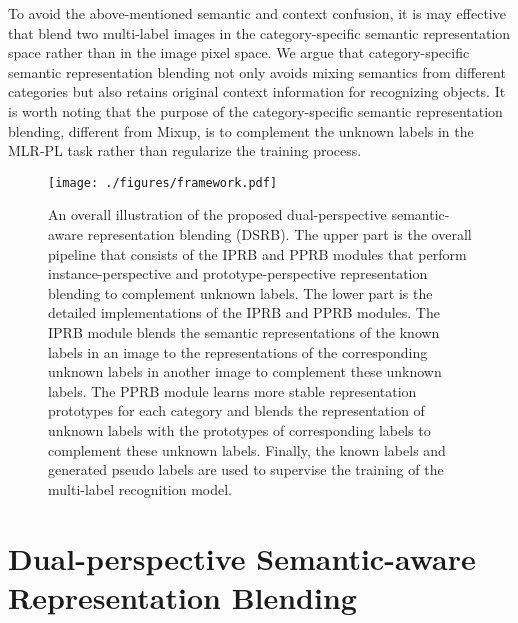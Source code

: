 \documentclass[lettersize,journal]{IEEEtran}
\begin{document}
To avoid the above-mentioned semantic and context confusion, it is may effective that blend two multi-label images in the category-specific semantic representation space rather than in the image pixel space. We argue that category-specific semantic representation blending not only avoids mixing semantics from different categories but also retains original context information for recognizing objects. It is worth noting that the purpose of the category-specific semantic representation blending, different from Mixup, is to complement the unknown labels in the MLR-PL task rather than regularize the training process. 

\begin{figure*}[!t]
   \centering
   \texttt{[image: ./figures/framework.pdf]}
   \caption{An overall illustration of the proposed dual-perspective semantic-aware representation blending (DSRB). The upper part is the overall pipeline that consists of the IPRB and PPRB modules that perform instance-perspective and prototype-perspective representation blending to complement unknown labels. The lower part is the detailed implementations of the IPRB and PPRB modules. The IPRB module blends the semantic representations of the known labels in an image  to the representations of the corresponding unknown labels in another image  to complement these unknown labels. The PPRB module learns more stable representation prototypes for each category and blends the representation of unknown labels with the prototypes of corresponding labels to complement these unknown labels. Finally, the known labels and generated pseudo labels are used to supervise the training of the multi-label recognition model.}
   \label{fig:framework}
\end{figure*}

\section{Dual-perspective Semantic-aware Representation Blending} \label{sec:method}
\end{document}
